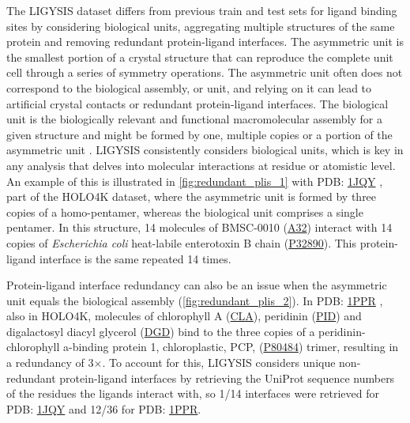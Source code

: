 The LIGYSIS dataset differs from previous train and test sets for ligand binding sites by considering biological units, aggregating multiple structures of the same protein and removing redundant protein-ligand interfaces. The asymmetric unit is the smallest portion of a crystal structure that can reproduce the complete unit cell through a series of symmetry operations. The asymmetric unit often does not correspond to the biological assembly, or unit, and relying on it can lead to artificial crystal contacts or redundant protein-ligand interfaces. The biological unit is the biologically relevant and functional macromolecular assembly for a given structure and might be formed by one, multiple copies or a portion of the asymmetric unit \cite{XU_2019_ASSEMBLIES}. LIGYSIS consistently considers biological units, which is key in any analysis that delves into molecular interactions at residue or atomistic level. An example of this is illustrated in \autoref{fig:redundant_plis_1} with PDB: \href{https://www.ebi.ac.uk/pdbe/entry/pdb/1jqy}{1JQY} \cite{PICKENS_2002_ANCHOR}, part of the HOLO4K dataset, where the asymmetric unit is formed by three copies of a homo-pentamer, whereas the biological unit comprises a single pentamer. In this structure, 14 molecules of BMSC-0010 (\href{https://www.rcsb.org/ligand/A32}{A32}) interact with 14 copies of \textit{Escherichia coli} heat-labile enterotoxin B chain (\href{https://www.uniprot.org/uniprotkb/P32890/entry}{P32890}). This protein-ligand interface is the same repeated 14 times.

\newpage

Protein-ligand interface redundancy can also be an issue when the asymmetric unit equals the biological assembly (\autoref{fig:redundant_plis_2}). In PDB: \href{https://www.ebi.ac.uk/pdbe/entry/pdb/1PPR}{1PPR} \cite{HOFMANN_1996_CAROTENOID}, also in HOLO4K, molecules of chlorophyll A (\href{https://www.ebi.ac.uk/pdbe-srv/pdbechem/chemicalCompound/show/CLA}{CLA}), peridinin (\href{https://www.ebi.ac.uk/pdbe-srv/pdbechem/chemicalCompound/show/PID}{PID}) and digalactosyl diacyl glycerol (\href{https://www.ebi.ac.uk/pdbe-srv/pdbechem/chemicalCompound/show/DGD}{DGD}) bind to the three copies of a peridinin-chlorophyll a-binding protein 1, chloroplastic, PCP, (\href{https://www.uniprot.org/uniprotkb/P80484/entry}{P80484}) trimer, resulting in a redundancy of 3$\times$. To account for this, LIGYSIS considers unique non-redundant protein-ligand interfaces by retrieving the UniProt sequence numbers of the residues the ligands interact with, so 1/14 interfaces were retrieved for PDB: \href{https://www.ebi.ac.uk/pdbe/entry/pdb/1JQY}{1JQY} and 12/36 for PDB: \href{https://www.ebi.ac.uk/pdbe/entry/pdb/1PPR}{1PPR}. %

